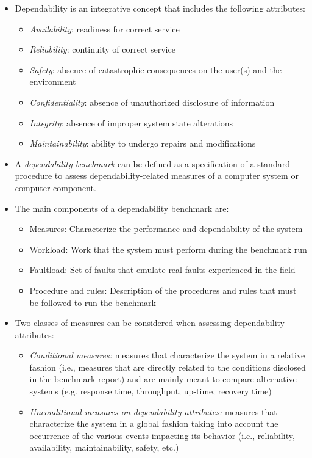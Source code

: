 \begin{itemize}
  \item Dependability is an integrative concept that includes the following attributes:
  \begin{itemize}
  	\item \textit{Availability}: readiness for correct service
  	\item \textit{Reliability}: continuity of correct service
  	\item \textit{Safety}: absence of catastrophic consequences on the user(s) and the environment
  	\item \textit{Confidentiality}: absence of unauthorized disclosure of information
  	\item \textit{Integrity}: absence of improper system state alterations
  	\item \textit{Maintainability}: ability to undergo repairs and modifications 
  \end{itemize}
  \item A \textit{dependability benchmark} can be defined as a specification of a standard procedure to assess dependability-related measures of a computer system or computer component.
  \item The main components of a dependability benchmark are:
  \begin{itemize}
  	\item Measures: Characterize the performance and dependability of the system
  	\item Workload: Work that the system must perform during the benchmark run
  	\item Faultload: Set of faults that emulate real faults experienced in the field
  	\item Procedure and rules: Description of the procedures and rules that must be followed to run the benchmark 
  \end{itemize}
  \item Two classes of measures can be considered when assessing dependability attributes:
  \begin{itemize}
  	\item \textit{Conditional measures:} measures that characterize the system in a relative fashion (i.e., measures that are directly related to the conditions disclosed in the benchmark report) and are mainly meant to compare alternative systems (e.g. response time, throughput, up-time, recovery time)
  	\item \textit{Unconditional measures on dependability attributes:} measures that characterize the system in a global fashion taking into account the occurrence of the various events impacting its behavior (i.e., reliability, availability, maintainability, safety, etc.) 

\end{itemize}
\end{itemize}
